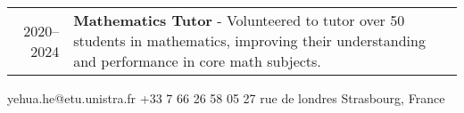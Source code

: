 \documentclass[lighthipster]{simplehipstercv}
\newlength{\rightcolwidth}
\begin{document}
\begin{paracol}{2}
\begin{tabular}{r| >{\footnotesize}p{} c}
    2020--2024 & {\small\textbf{Mathematics Tutor}} \newline - Volunteered to tutor over 50 students in mathematics, improving their understanding and performance in core math subjects. & \\
\end{tabular}


\vspace{4em}

\vfill{} %

\setlength{\parindent}{0pt}
\begin{minipage}[t]{\rightcolwidth}
\begin{center}\fontfamily{\sfdefault}\selectfont \color{black!70}
{\small  \qquad\qquad\quad{} yehua.he@etu.unistra.fr  +33 7 66 26 58 05\newline {}  27 rue de londres   Strasbourg, France  
}
\end{center}
\end{minipage}

\end{paracol}
\end{document}
